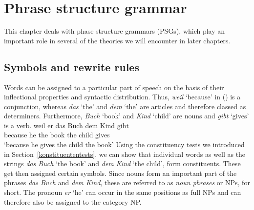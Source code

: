 
\chapter{Phrase structure grammar}
\label{Kapitel-PSG}

This chapter deals with phase structure grammars (PSGs), which play an important role in several of the theories we will encounter in later chapters.

\section{Symbols and rewrite rules}
\label{sec-simple-psg}

Words can be assigned to a particular part of speech on the basis of their inflectional properties
and syntactic distribution. Thus, \emph{weil} `because' in ()
is a conjunction, whereas \emph{das} `the' and \emph{dem} `the' are
articles and therefore classed as determiners. Furthermore, \emph{Buch} `book' and \emph{Kind} `child' are nouns 
and \emph{gibt} `gives' is a verb.
\ea\label{bsp-weil-er-das-buch-dem-Kind-gibt}
\gll weil er das Buch dem Kind gibt\\
	 because he the book the child gives\\
\glt `because he gives the child the book'
\z
Using the constituency tests we introduced in Section~\ref{konstituententests}, we can show that
individual words as well as the strings \emph{das Buch} `the book' and \emph{dem Kind} `the child',
form constituents. These get then assigned certain symbols. Since nouns form an important part of
the phrases \emph{das Buch} and \emph{dem Kind}, these are referred to as \emph{noun phrases} or
NPs, for short. The pronoun \emph{er} `he' can occur in the same positions as full NPs and can
therefore also be assigned to the category NP.

